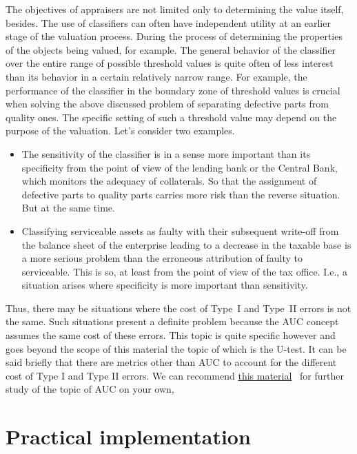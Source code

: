 \documentclass[]{scrreprt}
\begin{document}
The objectives of appraisers are not limited only to determining the value itself, besides. The use of classifiers can often have independent utility at an earlier stage of the valuation process. During the process of determining the properties of the objects being valued, for example. The general behavior of the classifier over the entire range of possible threshold values is quite often of less interest than its behavior in a certain relatively narrow range. For example, the performance of the classifier in the boundary zone of threshold values is crucial when solving the above discussed problem of separating defective parts from quality ones. The specific setting of such a threshold value may depend on the purpose of the valuation. Let's consider two examples.
\begin{itemize}
	\item The sensitivity of the classifier is in a sense more important than its specificity from the point of view of the lending bank or the Central Bank, which monitors the adequacy of collaterals. So that the assignment of defective parts to quality parts carries more risk than the reverse situation. But at the same time.
	\item Classifying serviceable assets as faulty with their subsequent write-off from the balance sheet of the enterprise leading to a decrease in the taxable base is a more serious problem than the erroneous attribution of faulty to serviceable. This is so, at least from the point of view of the tax office. I.e., a situation arises where specificity is more important than sensitivity.
\end{itemize}
Thus, there may be situations where the cost of Type~I and Type~II errors is not the same. Such situations present a definite problem because the AUC concept assumes the same cost of these errors. This topic is quite specific however and goes beyond the scope of this material the topic of which is the U-test. It can be said briefly that there are metrics other than AUC to account for the different cost of Type I and Type II errors. We can recommend \href{http://nicolas.kruchten.com/content/2016/01/ml-meets-economics/}{this material}~\cite{ML-meets-economics} for further study of the topic of AUC on your own,
%
\chapter{Practical implementation}\label{U-test-practice}
%
\end{document}
